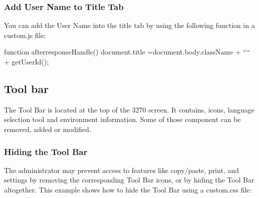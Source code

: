\documentclass[letterpaper,10pt,english]{sphinxmanual}
\begin{document}
\subsubsection{Add User Name to Title Tab}
\label{\detokenize{Customization:add-user-name-to-title-tab}}\label{\detokenize{Customization:index-15}}
You can add the User Name into the title tab by using the following function in a custom.js file:

\begin{sphinxVerbatim}[commandchars=\\\{\}]
function after\PYGZus{}responseHandle() \PYGZob{}
    document.title =document.body.className + “\PYGZhy{}“ + getUserId();
\PYGZcb{}
\end{sphinxVerbatim}



\subsection{Tool bar}
\label{\detokenize{Customization:tool-bar}}
The Tool Bar is located at the top of the 3270 screen. It contains, icons, language selection tool and environment
information. Some of those component can be removed, added or modified.

\ignorespaces 

\subsubsection{Hiding the Tool Bar}
\label{\detokenize{Customization:hiding-the-tool-bar}}\label{\detokenize{Customization:index-16}}
The administrator may prevent access to features like copy/paste, print, and settings by removing the corresponding Tool Bar icons, or by hiding the Tool Bar altogether. This example shows how to hide the Tool Bar using a custom.css file:

\begin{sphinxVerbatim}[commandchars=\\\{\}]
        
       
\end{sphinxVerbatim}
\end{document}
